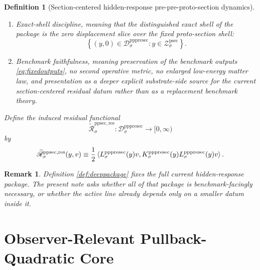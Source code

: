\documentclass[11pt]{article}
\newcommand{\ProtoSectionShell}[1]{\mathcal Z_{#1}^{\mathrm{psec}}}
\newcommand{\PrePreProtoSectionResidualBody}[1]{\mathcal D_{#1}^{\mathrm{pppresec}}}
\newcommand{\PrePreProtoSectionHidden}[1]{H_{#1}^{\mathrm{pppresec}}}
\newcommand{\PrePreProtoSectionResponseMap}[1]{L_{#1}^{\mathrm{pppresec}}}
\newcommand{\PrePreProtoSectionOperator}[1]{K_{#1}^{\mathrm{pppresec}}}
\newcommand{\InducedResidualFunctional}[1]{\widetilde{\mathscr R}_{#1}^{\mathrm{ppsec,res}}}
\newtheorem{definition}{Definition}
\newtheorem{remark}{Remark}
\begin{document}
\begin{definition}[Section-centered hidden-response pre-pre-proto-section dynamics]
\begin{enumerate}
\begin{equation}
    \ \eta\in\PrePreProtoSectionHidden{\sigma}
    \label{eq:gap}
    \end{equation}
    for some constant \(\mu_{\sigma}>0\).
    \item Exact-shell discipline, meaning that the distinguished exact shell of the package is the zero displacement slice over the fixed proto-section shell:
    \[
    \left\{
    (y,0)\in\PrePreProtoSectionResidualBody{\sigma}:y\in\ProtoSectionShell{\sigma}
    \right\}.
    \]
    \item Benchmark faithfulness, meaning preservation of the benchmark outputs \eqref{eq:fixedoutputs}, no second operative metric, no enlarged low-energy matter law, and presentation as a deeper explicit substrate-side source for the current section-centered residual datum rather than as a replacement benchmark theory.
\end{enumerate}
Define the induced residual functional
\[
\InducedResidualFunctional{\sigma}:
\PrePreProtoSectionResidualBody{\sigma}\to[0,\infty)
\]
by
\begin{equation}
\InducedResidualFunctional{\sigma}(y,v)
\equiv
\frac{1}{2}
\ev{
\PrePreProtoSectionResponseMap{\sigma}(y)v,
\PrePreProtoSectionOperator{\sigma}(y)
\PrePreProtoSectionResponseMap{\sigma}(y)v
}.
\label{eq:inducedresidual}
\end{equation}
\end{definition}

\begin{remark}
Definition \ref{def:deeppackage} fixes the full current hidden-response package. The present note asks whether all of that package is benchmark-facingly necessary, or whether the active line already depends only on a smaller datum inside it.
\end{remark}

\section{Observer-Relevant Pullback-Quadratic Core}
\end{document}
